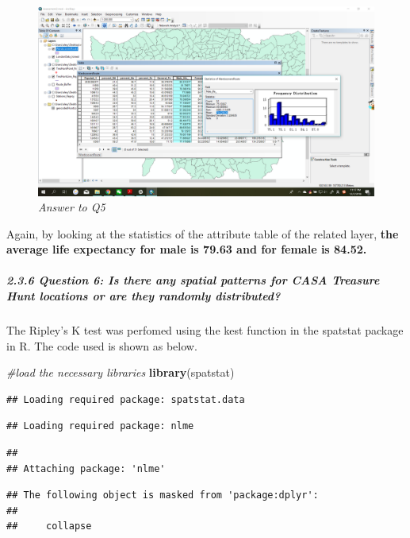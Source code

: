 \documentclass[]{article}
\newenvironment{Shaded}{\begin{snugshade}}{\end{snugshade}}
\newcommand{\KeywordTok}[1]{\textcolor[rgb]{0.13,0.29,0.53}{\textbf{#1}}}
\newcommand{\CommentTok}[1]{\textcolor[rgb]{0.56,0.35,0.01}{\textit{#1}}}
\newcommand{\NormalTok}[1]{#1}
\let\oldsubparagraph\subparagraph
\renewcommand{\subparagraph}[1]{\oldsubparagraph{#1}\mbox{}}
\begin{document}
\begin{figure}
\centering
\includegraphics{Part2/pngs/Q4.png}
\caption{\emph{Answer to Q5}}
\end{figure}

Again, by looking at the statistics of the attribute table of the
related layer, \textbf{the average life expectancy for male is 79.63 and
for female is 84.52.}

\subparagraph{2.3.6 Question 6: Is there any spatial patterns for CASA
Treasure Hunt locations or are they randomly
distributed?}\label{question-6-is-there-any-spatial-patterns-for-casa-treasure-hunt-locations-or-are-they-randomly-distributed}

The Ripley's K test was perfomed using the kest function in the spatstat
package in R. The code used is shown as below.

\begin{Shaded}
\begin{Highlighting}[]
\CommentTok{#load the necessary libraries}
\KeywordTok{library}\NormalTok{(spatstat)}
\end{Highlighting}
\end{Shaded}

\begin{verbatim}
## Loading required package: spatstat.data
\end{verbatim}

\begin{verbatim}
## Loading required package: nlme
\end{verbatim}

\begin{verbatim}
## 
## Attaching package: 'nlme'
\end{verbatim}

\begin{verbatim}
## The following object is masked from 'package:dplyr':
## 
##     collapse
\end{verbatim}
\end{document}
